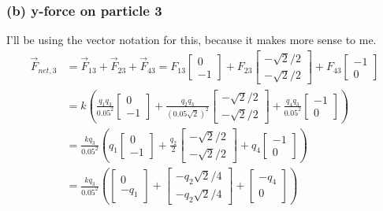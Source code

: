 \documentclass[12pt]{article}
\begin{document}
\subsubsection*{(b) y-force on particle 3}
I'll be using the vector notation for this, because it makes more sense to me. 
\begin{align*}
    \vec{F}_{net,3}   &=  \vec{F}_{13} + \vec{F}_{23} + \vec{F}_{43}
        =   F_{13}\left[\begin{smallmatrix}0\\-1\end{smallmatrix}\right] + F_{23}\left[\begin{smallmatrix}-\sqrt{2}/2\\-\sqrt{2}/2\end{smallmatrix}\right] + F_{43}\left[\begin{smallmatrix}-1\\0\end{smallmatrix}\right]\\
        &=  k\left( \frac{q_1 q_3}{0.05^2}\begin{bmatrix}0\\-1\end{bmatrix} + \frac{q_2 q_3}{(0.05\sqrt{2})^2}\begin{bmatrix}-\sqrt{2}/2\\-\sqrt{2}/2\end{bmatrix} + \frac{q_4 q_3}{0.05^2}\begin{bmatrix}-1\\0\end{bmatrix} \right)\\
        &=  \frac{k q_3}{0.05^2}\left( q_1\begin{bmatrix}0\\-1\end{bmatrix} + \frac{q_2}{2}\begin{bmatrix}-\sqrt{2}/2\\-\sqrt{2}/2\end{bmatrix} + q_4\begin{bmatrix}-1\\0\end{bmatrix} \right)\\
        &=  \frac{k q_3}{0.05^2}\left( \begin{bmatrix}0\\-q_1\end{bmatrix} + \begin{bmatrix}-q_2 \sqrt{2}/4\\-q_2 \sqrt{2}/4\end{bmatrix} + \begin{bmatrix}-q_4\\0\end{bmatrix} \right)\\

\end{align*}
\end{document}
